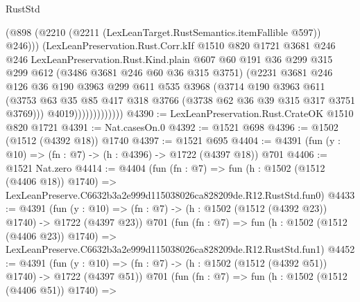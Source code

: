 \begin{lexlean}{RustStd}
\begin{coremodule}
                            (@898
                              (@2210 (@2211 (LexLeanTarget.RustSemantics.itemFallible @597)) @246)))
                          (LexLeanPreservation.Rust.Corr.kIf
                            @1510
                            @820
                            @1721
                            @3681
                            @246
                            @246
                            LexLeanPreservation.Rust.Kind.plain
                            @607
                            @60
                            @191
                            @36
                            @299
                            @315
                            @299
                            @612
                            (@3486 @3681 @246 @60 @36 @315 @3751)
                            (@2231
                              @3681
                              @246
                              @126
                              @36
                              @190
                              @3963
                              @299
                              @611
                              @535
                              @3968
                              (@3714
                                @190
                                @3963
                                @611
                                (@3753
                                  @63
                                  @35
                                  @85
                                  @417
                                  @318
                                  @3766
                                  (@3738 @62 @36 @39 @315 @317 @3751 @3769)))
                              @4019)))))))))))))
@4390 := LexLeanPreservation.Rust.CrateOK @1510 @820 @1721
@4391 := Nat.casesOn.{0}
@4392 := @1521 @698
@4396 := @1502 (@1512 (@4392 @18)) @1740
@4397 := @1521 @695
@4404 := @4391 (fun (y : @10) => (fn : @7) -> (h : @4396) -> @1722 (@4397 @18)) @701
@4406 := @1521 Nat.zero
@4414 := @4404
    (fun (fn : @7) =>
    fun (h : @1502 (@1512 (@4406 @18)) @1740) =>
    LexLeanPreserve.C6632b3a2e999d115038026ca828209de.R12.RustStd.fun0)
@4433 := @4391
    (fun (y : @10) => (fn : @7) -> (h : @1502 (@1512 (@4392 @23)) @1740) -> @1722 (@4397 @23))
    @701
    (fun (fn : @7) =>
    fun (h : @1502 (@1512 (@4406 @23)) @1740) =>
    LexLeanPreserve.C6632b3a2e999d115038026ca828209de.R12.RustStd.fun1)
@4452 := @4391
    (fun (y : @10) => (fn : @7) -> (h : @1502 (@1512 (@4392 @51)) @1740) -> @1722 (@4397 @51))
    @701
    (fun (fn : @7) =>
    fun (h : @1502 (@1512 (@4406 @51)) @1740) =>

\end{coremodule}
\end{lexlean}
